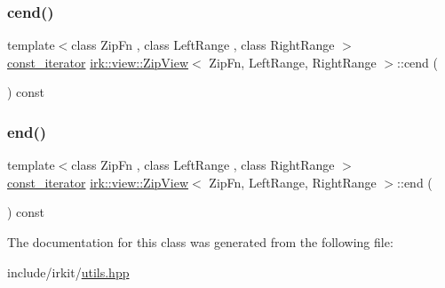 \mbox{\label{classirk_1_1view_1_1ZipView_a6fbf8792537a7ceddb15fa78e3c86221}} 
\subsubsection{\texorpdfstring{cend()}{cend()}}
{\footnotesize\ttfamily template$<$class Zip\+Fn , class Left\+Range , class Right\+Range $>$ \\
\mbox{\hyperlink{classirk_1_1view_1_1ZipView_1_1const__iterator}{const\+\_\+iterator}} \mbox{\hyperlink{classirk_1_1view_1_1ZipView}{irk\+::view\+::\+Zip\+View}}$<$ Zip\+Fn, Left\+Range, Right\+Range $>$\+::cend (\begin{DoxyParamCaption}{ }\end{DoxyParamCaption}) const\hspace{0.3cm}{\ttfamily [inline]}}

\mbox{\label{classirk_1_1view_1_1ZipView_a4739d0dbb2dd5e6a5c31f456cd8e62fc}} 
\subsubsection{\texorpdfstring{end()}{end()}}
{\footnotesize\ttfamily template$<$class Zip\+Fn , class Left\+Range , class Right\+Range $>$ \\
\mbox{\hyperlink{classirk_1_1view_1_1ZipView_1_1const__iterator}{const\+\_\+iterator}} \mbox{\hyperlink{classirk_1_1view_1_1ZipView}{irk\+::view\+::\+Zip\+View}}$<$ Zip\+Fn, Left\+Range, Right\+Range $>$\+::end (\begin{DoxyParamCaption}{ }\end{DoxyParamCaption}) const\hspace{0.3cm}{\ttfamily [inline]}}



The documentation for this class was generated from the following file\+:\begin{DoxyCompactItemize}
\item 
include/irkit/\mbox{\hyperlink{utils_8hpp}{utils.\+hpp}}\end{DoxyCompactItemize}
